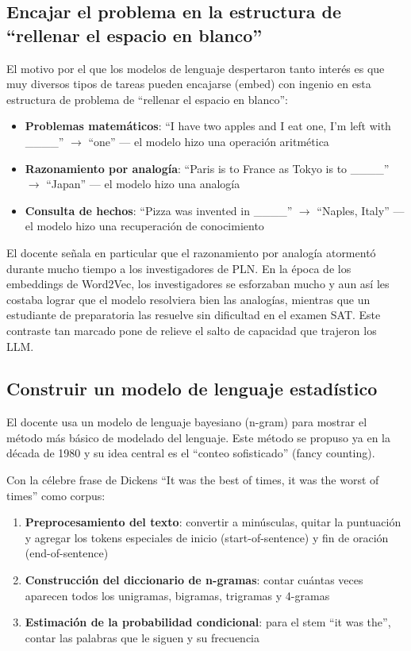 \subsection{Encajar el problema en la estructura de ``rellenar el espacio en blanco''}

El motivo por el que los modelos de lenguaje despertaron tanto interés es que muy diversos tipos de tareas pueden encajarse (embed) con ingenio en esta estructura de problema de ``rellenar el espacio en blanco'':

\begin{itemize}
    \item \textbf{Problemas matemáticos}: ``I have two apples and I eat one, I'm left with \_\_\_\_'' $\rightarrow$ ``one'' — el modelo hizo una operación aritmética
    \item \textbf{Razonamiento por analogía}: ``Paris is to France as Tokyo is to \_\_\_\_'' $\rightarrow$ ``Japan'' — el modelo hizo una analogía
    \item \textbf{Consulta de hechos}: ``Pizza was invented in \_\_\_\_'' $\rightarrow$ ``Naples, Italy'' — el modelo hizo una recuperación de conocimiento
\end{itemize}

El docente señala en particular que el razonamiento por analogía atormentó durante mucho tiempo a los investigadores de PLN. En la época de los embeddings de Word2Vec, los investigadores se esforzaban mucho y aun así les costaba lograr que el modelo resolviera bien las analogías, mientras que un estudiante de preparatoria las resuelve sin dificultad en el examen SAT. Este contraste tan marcado pone de relieve el salto de capacidad que trajeron los LLM.

\subsection{Construir un modelo de lenguaje estadístico}

El docente usa un modelo de lenguaje bayesiano (n-gram) para mostrar el método más básico de modelado del lenguaje. Este método se propuso ya en la década de 1980 y su idea central es el ``conteo sofisticado'' (fancy counting).

Con la célebre frase de Dickens ``It was the best of times, it was the worst of times'' como corpus:

\begin{enumerate}
    \item \textbf{Preprocesamiento del texto}: convertir a minúsculas, quitar la puntuación y agregar los tokens especiales de inicio (start-of-sentence) y fin de oración (end-of-sentence)
    \item \textbf{Construcción del diccionario de n-gramas}: contar cuántas veces aparecen todos los unigramas, bigramas, trigramas y 4-gramas
    \item \textbf{Estimación de la probabilidad condicional}: para el stem ``it was the'', contar las palabras que le siguen y su frecuencia
\end{enumerate}

